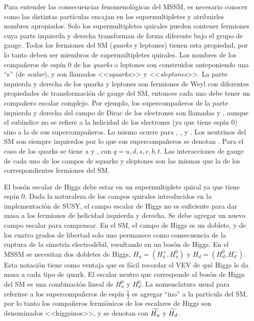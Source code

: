 Para entender las consecuencias fenomenológicas del MSSM, es necesario conocer
como las distintas partículas encajan en los supermultipletes y atribuirles nombres
apropiados. Solo los supermultipletes quirales pueden contener fermiones cuya parte
izquierda y derecha transforman de forma diferente bajo el grupo de gauge. Todos
los fermiones del SM (\emph{quarks} y leptones) tienen esta propiedad, por lo tanto
deben ser miembros de supermultipletes quirales. Los nombres de los compañeros
de espín 0 de los \emph{quarks} o leptones son construidos anteponiendo una ``s'' (de
\emph{scalar}), y son llamados <<\emph{squarks}>> y <<\emph{sleptones}>>.
La parte izquierda y derecha de los quarks y leptones son
fermiones de Weyl con diferentes propiedades de transformación de gauge del SM,
entonces cada uno debe tener un compañero escalar complejo. Por ejemplo, los
supercompañeros de la parte izquierda y derecha del campo de Dirac de los
electrones son llamadas {\selL} y {\selR}, aunque el subíndice no se refiere a
la helicidad de los slectrones (ya que tiene espín 0) sino a la de sus supercompañeros.
Lo mismo ocurre para {\smuL}, {\smuR}, {\stauL} y {\stauR}. Los neutrinos del SM
son siempre izquierdos por lo que sus supercompañeros se denotan {\snu}. Para
el caso de los quarks se tiene a {\squarkL} y {\squarkR}, con $q = u, d, s, c, b, t$. Las
interacciones de gauge de cada uno de los campos de squarks y sleptones son las
mismas que la de los correspondientes fermiones del SM.

El bosón escalar de Higgs debe estar en un supermultiplete quiral ya que tiene
espín 0. Dada la naturaleza de los campos quirales introducidos en la
implementación de SUSY, el campo escalar de Higgs no es suficiente para dar masa
a los fermiones de helicidad izquierda y derecha. Se debe agregar un nuevo campo
escalar para compensar. En el SM, el campo de Higgs es un doblete, y de los
cuatro grados de libertad solo uno permanece como consecuencia de la ruptura de
la simetría electrodébil, resultando en un bosón de Higgs. En el MSSM se
necesitan dos dobletes de Higgs, $H_u = (H_u^+, H_u^0)$ y $H_d = (H_d^0,
H_d^-)$. Esta notación tiene como ventaja que es fácil recordar el VEV de qué
Higgs le da masa a cada tipo de quark. El escalar neutro que corresponde al
bosón de Higgs del SM es una combinación lineal de $H_u^0$ y $H_d^0$. La
nomenclatura usual para referirse a los supercompa\~neros de espín $\frac{1}{2}$ es
agregar ``ino'' a la partícula del SM, por lo tanto los compañeros fermiónicos
de los escalares de Higgs son denominados <<higgsinos>>, y se denotan con
$\widetilde{H_u}$ y $\widetilde{H_d}$.

